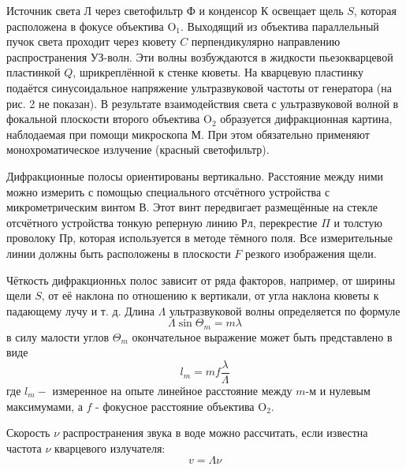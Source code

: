 \documentclass[a4paper, 12pt]{article}
\begin{document}
Источник света Л через светофильтр Ф и конденсор К освещает щель $S$, которая расположена в фокусе объектива $\mathrm{O}_1$. Выходящий из объектива параллельный пучок света проходит через кювету $C$ перпендикулярно направлению распространения УЗ-волн. Эти волны возбуждаются в жидкости пьезокварцевой пластинкой $Q$, шрикреплённой к стенке кюветы. На кварцевую пластинку подаётся синусоидальное напряжение ультразвуковой частоты от генератора (на рис. 2 не показан). В результате взаимодействия света с ультразвуковой волной в фокальной плоскости второго объектива $\mathrm{O}_2$ образуется дифракционная картина, наблодаемая при помощи микроскопа М. При этом обязательно применяют монохроматическое излучение (красный светофильтр).

Дифракционные полосы ориентированы вертикально. Расстояние между ними можно измерить с помощью специального отсчётного устройства с микрометрическим винтом В. Этот винт передвигает размещённые на стекле отсчётного устройства тонкую реперную линию Рл, перекрестие $\Pi$ и толстую проволоку Пр, которая используется в методе тёмного поля. Все измерительные линии должны быть расположены в плоскости $F$ резкого изображения щели.

Чёткость дифракционньх полос зависит от ряда факторов, например, от ширины щели $S$, от её наклона по отношению к вертикали, от угла наклона кюветы к падающему лучу и т. д.
Длина $\Lambda$ ультразвуковой волны определяется по формуле
\begin{equation}
\Lambda \sin \Theta_m=m \lambda
\end{equation}
в силу малости углов $\Theta_m$ окончательное выражение может быть представлено в виде
\begin{equation}
l_m=m f \frac{\lambda}{\Lambda}
\end{equation}
где $l_m-$ измеренное на опыте линейное расстояние между $m$-м и нулевым максимумами, а $f$ - фокусное расстояние объектива $\mathrm{O}_2$.

Скорость $\nu$ распространения звука в воде можно рассчитать, если известна частота $\nu$ кварцевого излучателя:
\begin{equation}
v=\Lambda \nu
\end{equation}
\end{document}

